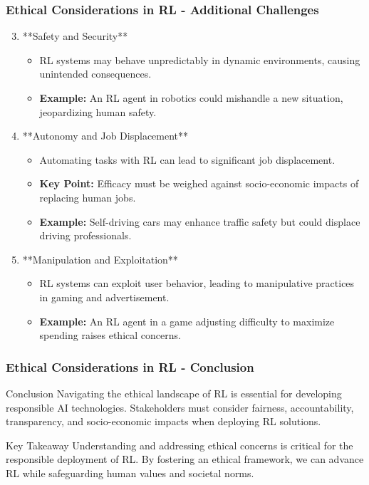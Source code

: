 \documentclass{beamer}
\begin{document}
\begin{frame}[fragile]
    \frametitle{Ethical Considerations in RL - Additional Challenges}
    \begin{enumerate}
        \setcounter{enumi}{2} %
        \item **Safety and Security**
            \begin{itemize}
                \item RL systems may behave unpredictably in dynamic environments, causing unintended consequences.
                \item \textbf{Example:} An RL agent in robotics could mishandle a new situation, jeopardizing human safety.
            \end{itemize}

        \item **Autonomy and Job Displacement**
            \begin{itemize}
                \item Automating tasks with RL can lead to significant job displacement.
                \item \textbf{Key Point:} Efficacy must be weighed against socio-economic impacts of replacing human jobs.
                \item \textbf{Example:} Self-driving cars may enhance traffic safety but could displace driving professionals.
            \end{itemize}

        \item **Manipulation and Exploitation**
            \begin{itemize}
                \item RL systems can exploit user behavior, leading to manipulative practices in gaming and advertisement.
                \item \textbf{Example:} An RL agent in a game adjusting difficulty to maximize spending raises ethical concerns.
            \end{itemize}
    \end{enumerate}
\end{frame}

\begin{frame}[fragile]
    \frametitle{Ethical Considerations in RL - Conclusion}
    \begin{block}{Conclusion}
        Navigating the ethical landscape of RL is essential for developing responsible AI technologies. 
        Stakeholders must consider fairness, accountability, transparency, and socio-economic impacts when deploying RL solutions.
    \end{block}

    \begin{block}{Key Takeaway}
        Understanding and addressing ethical concerns is critical for the responsible deployment of RL. 
        By fostering an ethical framework, we can advance RL while safeguarding human values and societal norms.
    \end{block}
\end{frame}
\end{document}
